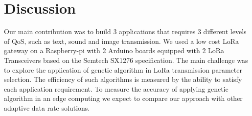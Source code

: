 \section{Discussion} \label{sec:Conclusion}


Our main contribution was to build 3 applications that requires 3 different levels of QoS,
	such as text,
	sound and image transmission.
We used a low cost LoRa gateway on a Raspberry-pi with 2 Arduino boards equipped with 2 LoRa Transceivers based on the Semtech SX1276 specification.
The main challenge  was to explore the application of genetic algorithm in LoRa transmission parameter selection.
The efficiency of such algorithms is measured by the ability to satisfy each application requirement.
To measure the accuracy of applying genetic algorithm in an edge computing we expect to compare our approach with other adaptive data rate solutions.







